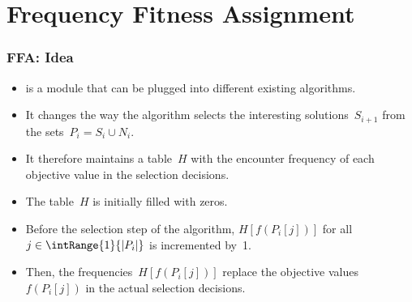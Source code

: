\documentclass[aspectratio=169,mathserif,notheorems]{beamer}%
\begin{document}
\section{Frequency Fitness Assignment}%
%
\begin{frame}%
\frametitle{FFA: Idea}%
\begin{itemize}%
\item {} is a module that can be plugged into different existing algorithms.%
\item<2-> It changes the way the algorithm selects the interesting solutions~$S_{i+1}$ from the sets~$P_i=S_i\cup N_i$.%
\item<3-> It therefore maintains a table~$H$ with the encounter frequency of each objective value in the selection decisions.%
\item<4-> The table~$H$ is initially filled with zeros.%
\item<5-> Before the selection step of the algorithm, $H[f(P_i[j])]$ for all $j\in\intRange{1}{|P_i|}$ is incremented by~1.%
\item<6-> Then, the frequencies~$H[f(P_i[j])]$ replace the objective values $f(P_i[j])$ in the actual selection decisions.%
\end{itemize}%
\end{frame}%
%
\end{document}
